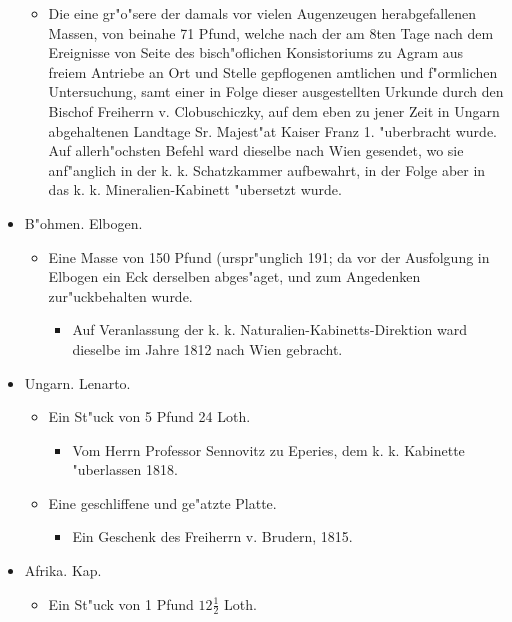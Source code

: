 \documentclass[a4paper, 11pt, oneside, polutonikogreek, german]{article}
\begin{document}
\begin{itemize}
\begin{itemize}
        \item Die eine gr"o"sere der damals vor vielen Augenzeugen herabgefallenen Massen, von beinahe 71 Pfund, welche nach der am 8ten Tage nach dem Ereignisse von Seite des bisch"oflichen Konsistoriums zu Agram aus freiem Antriebe an Ort und Stelle gepflogenen amtlichen und f"ormlichen Untersuchung, samt einer in Folge dieser ausgestellten Urkunde durch den Bischof Freiherrn v. Clobuschiczky, auf dem eben zu jener Zeit in Ungarn abgehaltenen Landtage Sr. Majest"at Kaiser Franz 1. "uberbracht wurde. Auf allerh"ochsten Befehl ward dieselbe nach Wien gesendet, wo sie anf"anglich in der k. k. Schatzkammer aufbewahrt, in der Folge aber in das k. k. Mineralien-Kabinett "ubersetzt wurde.
    \end{itemize}
    \item B"ohmen. Elbogen.
    \begin{itemize}
        \item Eine Masse von 150 Pfund (urspr"unglich 191; da vor der Ausfolgung in Elbogen ein Eck derselben abges"aget, und zum Angedenken zur"uckbehalten wurde.
        \begin{itemize}
            \item Auf Veranlassung der k. k. Naturalien-Kabinetts-Direktion ward dieselbe im Jahre 1812 nach Wien gebracht.
        \end{itemize}
    \end{itemize}
    \item Ungarn. Lenarto.
    \begin{itemize}
        \item Ein St"uck von 5 Pfund 24 Loth.
        \begin{itemize}
            \item Vom Herrn Professor Sennovitz zu Eperies, dem k. k. Kabinette "uberlassen 1818.
        \end{itemize}
        \item Eine geschliffene und ge"atzte Platte.
        \begin{itemize}
            \item Ein Geschenk des Freiherrn v. Brudern, 1815.
        \end{itemize}
    \end{itemize}
    \item Afrika. Kap.
    \begin{itemize}
        \item Ein St"uck von 1 Pfund $\mathfrak{12\frac{1}{2}}$ Loth.
        \begin{itemize}

\end{itemize}
\end{itemize}
\end{itemize}
\end{document}
